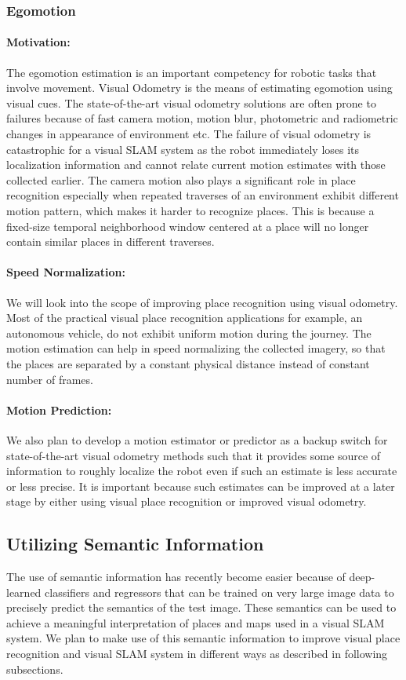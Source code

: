 \documentclass{article}
\begin{document}
\subsubsection{Egomotion}
\paragraph{Motivation:}The egomotion estimation is an important competency for robotic tasks that involve movement. Visual Odometry is the means of estimating egomotion using visual cues. The state-of-the-art visual odometry solutions are often prone to failures because of fast camera motion, motion blur, photometric and radiometric changes in appearance of environment etc. The failure of visual odometry is catastrophic for a visual SLAM system as the robot immediately loses its localization information and cannot relate current motion estimates with those collected earlier. The camera motion also plays a significant role in place recognition especially when repeated traverses of an environment exhibit different motion pattern, which makes it harder to recognize places. This is because a fixed-size temporal neighborhood window centered at a place will no longer contain similar places in different traverses.

\paragraph{Speed Normalization:}We will look into the scope of improving place recognition using visual odometry. Most of the practical visual place recognition applications for example, an autonomous vehicle, do not exhibit uniform motion during the journey. The motion estimation can help in speed normalizing the collected imagery, so that the places are separated by a constant physical distance instead of constant number of frames.

\paragraph{Motion Prediction:}We also plan to develop a motion estimator or predictor as a backup switch for state-of-the-art visual odometry methods such that it provides some source of information to roughly localize the robot even if such an estimate is less accurate or less precise. It is important because such estimates can be improved at a later stage by either using visual place recognition or improved visual odometry.


\subsection{Utilizing Semantic Information}
The use of semantic information has recently become easier because of deep-learned classifiers and regressors that can be trained on very large image data to precisely predict the semantics of the test image. These semantics can be used to achieve a meaningful interpretation of places and maps used in a visual SLAM system. We plan to make use of this semantic information to improve visual place recognition and visual SLAM system in different ways as described in following subsections.
\end{document}
